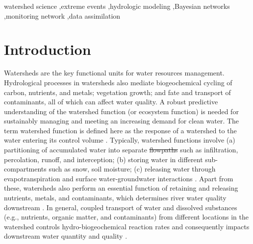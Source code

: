 \documentclass[preprint,review, 12pt]{elsarticle}
\providecommand{\DIFadd}[1]{{\protect\color{blue}\uwave{#1}}} %
\providecommand{\DIFdel}[1]{{\protect\color{red}\sout{#1}}}                      %
\providecommand{\DIFaddbegin}{} %
\providecommand{\DIFaddend}{} %
\providecommand{\DIFdelbegin}{} %
\providecommand{\DIFdelend}{} %
\newcommand{\DIFscaledelfig}{0.5}
\newlength{\DIFdelgraphicswidth} %
\newlength{\DIFdelgraphicsheight} %
\newcommand{\DIFaddincludegraphics}[2][]{{\color{blue}\fbox{\DIFOincludegraphics[#1]{#2}}}} %
\newcommand{\DIFdelincludegraphics}[2][]{%
\sbox{\DIFdelgraphicsbox}{\DIFOincludegraphics[#1]{#2}}%
\settoboxwidth{\DIFdelgraphicswidth}{\DIFdelgraphicsbox} %
\settoboxtotalheight{\DIFdelgraphicsheight}{\DIFdelgraphicsbox} %
\scalebox{\DIFscaledelfig}{%
\parbox[b]{\DIFdelgraphicswidth}{\usebox{\DIFdelgraphicsbox}\\[-\baselineskip] \rule{\DIFdelgraphicswidth}{0em}}\llap{\resizebox{\DIFdelgraphicswidth}{\DIFdelgraphicsheight}{%
\setlength{\unitlength}{\DIFdelgraphicswidth}%
\begin{picture}(1,1)%
\thicklines\linethickness{2pt} %
{\color[rgb]{1,0,0}\put(0,0){\framebox(1,1){}}}%
{\color[rgb]{1,0,0}\put(0,0){\line( 1,1){1}}}%
{\color[rgb]{1,0,0}\put(0,1){\line(1,-1){1}}}%
\end{picture}%
}\hspace*{3pt}}} %
} %
\DeclareRobustCommand{\DIFaddbegin}{\DIFOaddbegin \let\includegraphics\DIFaddincludegraphics} %
\DeclareRobustCommand{\DIFaddend}{\DIFOaddend \let\includegraphics\DIFOincludegraphics} %
\DeclareRobustCommand{\DIFdelbegin}{\DIFOdelbegin \let\includegraphics\DIFdelincludegraphics} %
\DeclareRobustCommand{\DIFdelend}{\DIFOaddend \let\includegraphics\DIFOincludegraphics} %
\begin{document}
\begin{frontmatter}
\begin{keyword}
watershed science \sep extreme events \sep hydrologic modeling \sep Bayesian networks \sep monitoring network \sep data assimilation


\end{keyword}

\end{frontmatter}


\linenumbers
\section{Introduction}

Watersheds are the key functional units for water resources management. Hydrological processes in watersheds also mediate biogeochemical cycling of carbon, nutrients, and metals; vegetation growth; and fate and transport of contaminants, all of which can affect water quality. A robust predictive understanding of the watershed function (or ecosystem function) is needed for sustainably managing and meeting an increasing demand for clean water. The term watershed function is defined here as the response of a watershed to the water entering its control volume \citep{wagener2007catchment}. Typically, watershed functions involve (a) partitioning of accumulated water into separate \DIFdelbegin \DIFdel{flowpaths }\DIFdelend \DIFaddbegin \DIFadd{flow paths }\DIFaddend such as infiltration, percolation, runoff, and interception; (b) storing water in different sub-compartments such as snow, soil moisture; (c) releasing water through evapotranspiration and surface water-groundwater interactions \citep{Sivapalan2005, wagener2007catchment}. Apart from these, watersheds also perform an essential function of retaining and releasing nutrients, metals, and contaminants, which determines river water quality downstream \citep{Hubbard2018}. In general, coupled transport of water and dissolved substances (e.g., nutrients, organic matter, and contaminants) from different locations in the watershed controls hydro-biogeochemical reaction rates and consequently impacts downstream water quantity and quality \citep{kirchner2006getting}. 
\end{document}

